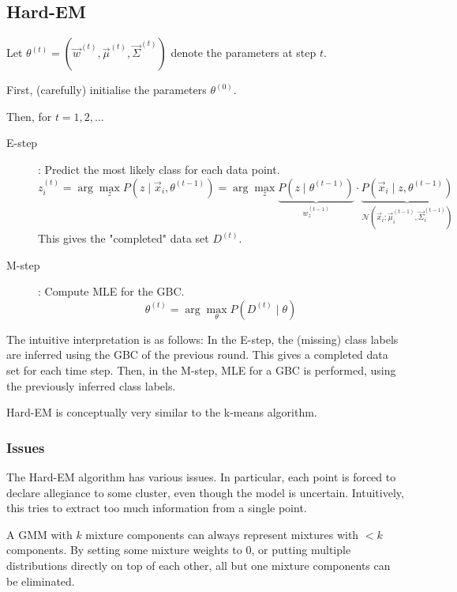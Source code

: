 \subsection{Hard-EM}
Let $\theta^{(t)} = (\vec{w}^{(t)}, \vec{\mu}^{(t)}, \vec{\Sigma}^{(t)})$
denote the parameters at step $t$.

First, (carefully) initialise the parameters
$\theta^{(0)}$.

Then, for $t = 1, 2, \dotsc$
\begin{description}
    \item[E-step]: Predict the most likely class for each data point.
    \begin{equation*}
        z_i^{(t)} = \arg\max_z{
            P(z \mid \vec{x}_i, \theta^{(t-1)})
        }
        = \arg\max_z{
            \underbrace{P(z \mid \theta^{(t-1)})}_{w_z^{(t-1)}}
            \cdot
            \underbrace{P(\vec{x}_i \mid z, \theta^{(t-1)})}_{\mathcal{N}(\vec{x}_i; \vec{\mu}_i^{(t-1)}, \vec{\Sigma}_i^{(t-1)})}
        }
    \end{equation*}
    This gives the "completed" data set $D^{(t)}$.
    \item[M-step]: Compute MLE for the GBC.
    \begin{equation*}
        \theta^{(t)} = \arg\max_\theta{P(D^{(t)} \mid \theta)}
    \end{equation*}
\end{description}

The intuitive interpretation is as follows:
In the E-step, the (missing) class labels are inferred
using the GBC of the previous round.
This gives a completed data set for each time step.
Then, in the M-step, MLE for a GBC is performed,
using the previously inferred class labels.

Hard-EM is conceptually very similar to the k-means algorithm.

\subsubsection{Issues}
The Hard-EM algorithm has various issues.
In particular, each point is forced to
declare allegiance to some cluster,
even though the model is uncertain.
Intuitively, this tries to extract too much
information from a single point.

A GMM with $k$ mixture components can always
represent mixtures with $< k$ components.
By setting some mixture weights to $0$,
or putting multiple distributions directly
on top of each other,
all but one mixture components can be eliminated.

